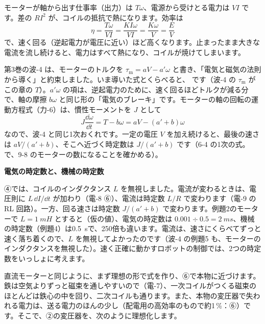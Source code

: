 モーターが軸から出す仕事率（出力）は $T\omega$、電源から受けとる電力は $VI$ です。差の $RI^2$ が、コイルの抵抗で熱になります。効率は
\[\eta=\frac{T\omega}{VI}=\frac{KI\omega}{VI}=\frac{K\omega}{V}=\frac{E}{V}\]
で、速く回る（逆起電力が電圧に近い）ほど高くなります。止まったまま大きな電流を流し続けると、電力はすべて熱になり、コイルが焼けてしまいます。

第3巻の波-4 は、モーターのトルクを $\tau_{\mathrm m}=aV-a'\omega$ と書き、「電気と磁気の法則から導く」と約束しました。いま導いた式とくらべると、
です（波-4 の $\tau_{\mathrm m}$ がこの章の $T$）。$a'\omega$ の項は、逆起電力のために、速く回るほどトルクが減る分で、軸の摩擦 $b\omega$ と同じ形の「電気のブレーキ」です。モーターの軸の回転の運動方程式（力-6）は、慣性モーメントを $J$ として
\[J\frac{\dd\omega}{\dd t}=T-b\omega=aV-(a'+b)\omega\]
なので、波-4 と同じ1次おくれです。一定の電圧 $V$ を加え続けると、最後の速さは $aV/(a'+b)$、そこへ近づく時定数は $J/(a'+b)$ です（6-4 の1次の式。で、9-8 のモーターの数になることを確かめる）。

\begin{motto}[4]
\textbf{電気の時定数と、機械の時定数}\par
④では、コイルのインダクタンス $L$ を無視しました。電流が変わるときは、電圧則に $L\,\dd I/\dd t$ が加わり（電-8 ⑥）、電流は時定数 $L/R$ で変わります（電-9 の RL 回路）。一方、回る速さは時定数 $J/(a'+b)$ で変わります。例題2のモーターで $L=\qty{1}{mH}$ とすると（仮の値）、電気の時定数は $0.001\div0.5=\qty{2}{ms}$、機械の時定数（例題4）は\qty{0.5}{s}で、250倍も違います。電流は、速さにくらべてずっと速く落ち着くので、$L$ を無視してよかったのです（波-4 の例題5 も、モーターのインダクタンスを無視した）。速く正確に動かすロボットの制御では、2つの時定数をいっしょに考えます。
\end{motto}

\label{ph:電-12:sec5}
直流モーターと同じように、まず理想の形で式を作り、⑥で本物に近づけます。鉄は空気よりずっと磁束を通しやすいので（電-7）、一次コイルがつくる磁束のほとんどは鉄心の中を回り、二次コイルも通ります。また、本物の変圧器で失われる電力は、送る電力のほんの少し（配電用の高効率のもので約1\,\%：⑥）です。そこで、②の変圧器を、次のように理想化します。
\begin{phmodel}[理想の変圧器]
\end{phmodel}

